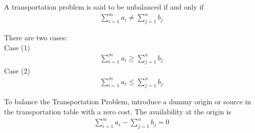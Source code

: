 \documentclass[12pt]{report}
\newcommand{\sps}{\\[0.2cm]}
\newcommand{\NI}{\noindent}
\newcommand{\dsp}{\displaystyle}
\newcommand{\tp}{Transportation Problem }
\newcommand{\stp}{transportation problem }
\newcommand{\stps}{transportation problems }
\begin{document}
	\NI A \stp is said to be unbalanced if and only if
	\begin{eqnarray}
		\sum_{i=1}^{m}a_i \neq \sum_{j=1}^{n}b_j\label{eq:3_5}
	\end{eqnarray} 
	
	\NI There are two cases:\\
	Case (1)
	\begin{eqnarray}
		\sum_{i=1}^{m}a_i \geq \sum_{j=1}^{n}b_j\label{eq:3_6}
	\end{eqnarray}
	Case (2)
	\begin{eqnarray}
		\sum_{i=1}^{m}a_i \leq \sum_{j=1}^{n}b_j\label{eq:3_7}
	\end{eqnarray}
	
	\NI To balance the Transportation Problem, introduce a dummy origin or source in the transportation table with a zero cost. The availability at the origin is
	\begin{eqnarray}
		\sum_{i=1}^{m}a_i - \sum_{j=1}^{n}b_j = 0 \label{eq:3_8}
	\end{eqnarray}

%	
\end{document}
